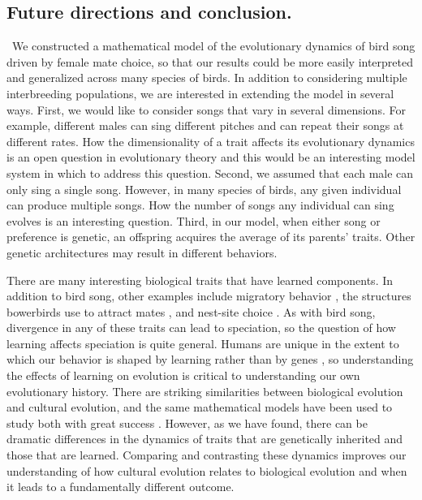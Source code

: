 \documentclass[12pt]{article}
\begin{document}
\subsection*{Future directions and conclusion. }
\ We constructed a mathematical model of the evolutionary dynamics of bird song driven by female mate choice, so that our results could be more easily interpreted and generalized across many species of birds. In addition to considering multiple interbreeding populations, we are interested in extending the model in several ways. First, we would like to consider songs that vary in several dimensions. For example, different males can sing different pitches and can repeat their songs at different rates. How the dimensionality of a trait affects its evolutionary dynamics is an open question in evolutionary theory and this would be an interesting model system in which to address this question. Second, we assumed that each male can only sing a single song. However, in many species of birds, any given individual can produce multiple songs. How the number of songs any individual can sing evolves is an interesting question. 
Third, in our model, when either song or preference is genetic, an offspring acquires the average of its parents' traits. Other genetic architectures may result in different behaviors.
 

There are many interesting biological traits that have learned components. In addition to bird song, other examples include migratory behavior \cite{Mueller:2013bh}, the structures bowerbirds use to attract mates \cite{Madden:2008ij}, and nest-site choice \cite{Seppanen:2007zr}. As with bird song, divergence in any of these traits can lead to speciation, so the question of how learning affects speciation is quite general. Humans are unique in the extent to which our behavior is shaped by learning rather than by genes \cite{Laland:2010fu}, so understanding the effects of learning on evolution is critical to understanding our own evolutionary history. There are striking similarities between biological evolution and cultural evolution, and the same mathematical models have been used to study both with great success \cite{Mesoudi:2006fk}. However, as we have found, there can be dramatic differences in the dynamics of traits that are genetically inherited and those that are learned. Comparing and contrasting these dynamics improves our understanding of how cultural evolution relates to biological evolution and when it leads to a fundamentally different outcome.
\end{document}
